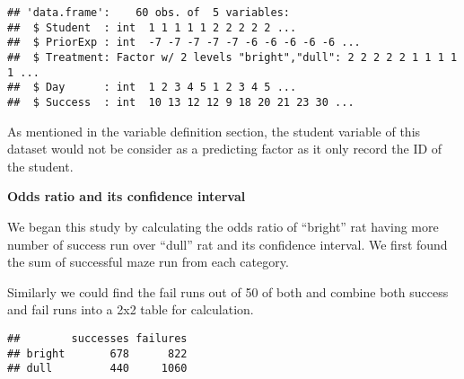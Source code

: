 \documentclass[
]{article}
\newenvironment{Shaded}{\begin{snugshade}}{\end{snugshade}}
\newcommand{\DecValTok}[1]{\textcolor[rgb]{0.00,0.00,0.81}{#1}}
\newcommand{\FunctionTok}[1]{\textcolor[rgb]{0.13,0.29,0.53}{\textbf{#1}}}
\newcommand{\NormalTok}[1]{#1}
\newcommand{\OtherTok}[1]{\textcolor[rgb]{0.56,0.35,0.01}{#1}}
\newcommand{\SpecialCharTok}[1]{\textcolor[rgb]{0.81,0.36,0.00}{\textbf{#1}}}
\begin{document}
\begin{verbatim}
## 'data.frame':    60 obs. of  5 variables:
##  $ Student  : int  1 1 1 1 1 2 2 2 2 2 ...
##  $ PriorExp : int  -7 -7 -7 -7 -7 -6 -6 -6 -6 -6 ...
##  $ Treatment: Factor w/ 2 levels "bright","dull": 2 2 2 2 2 1 1 1 1 1 ...
##  $ Day      : int  1 2 3 4 5 1 2 3 4 5 ...
##  $ Success  : int  10 13 12 12 9 18 20 21 23 30 ...
\end{verbatim}

As mentioned in the variable definition section, the student variable of
this dataset would not be consider as a predicting factor as it only
record the ID of the student.

\textbf{Odds ratio and its confidence interval}

We began this study by calculating the odds ratio of ``bright'' rat
having more number of success run over ``dull'' rat and its confidence
interval. We first found the sum of successful maze run from each
category.

\begin{Shaded}
\end{Shaded}

Similarly we could find the fail runs out of 50 of both and combine both
success and fail runs into a 2x2 table for calculation.

\begin{Shaded}
\end{Shaded}

\begin{verbatim}
##        successes failures
## bright       678      822
## dull         440     1060
\end{verbatim}
\end{document}
